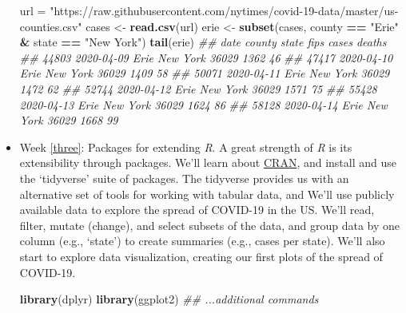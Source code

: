 \documentclass[
]{book}
\newenvironment{Shaded}{\begin{snugshade}}{\end{snugshade}}
\newcommand{\CommentTok}[1]{\textcolor[rgb]{0.56,0.35,0.01}{\textit{#1}}}
\newcommand{\KeywordTok}[1]{\textcolor[rgb]{0.13,0.29,0.53}{\textbf{#1}}}
\newcommand{\NormalTok}[1]{#1}
\newcommand{\OperatorTok}[1]{\textcolor[rgb]{0.81,0.36,0.00}{\textbf{#1}}}
\newcommand{\StringTok}[1]{\textcolor[rgb]{0.31,0.60,0.02}{#1}}
\begin{document}
\begin{itemize}
\begin{Shaded}
\begin{Highlighting}[]
\NormalTok{url =}\StringTok{ "https://raw.githubusercontent.com/nytimes/covid-19-data/master/us-counties.csv"}
\NormalTok{cases <-}\StringTok{ }\KeywordTok{read.csv}\NormalTok{(url)}
\NormalTok{erie <-}\StringTok{ }\KeywordTok{subset}\NormalTok{(cases, county }\OperatorTok{==}\StringTok{ "Erie"} \OperatorTok{&}\StringTok{ }\NormalTok{state }\OperatorTok{==}\StringTok{ "New York"}\NormalTok{)}
\KeywordTok{tail}\NormalTok{(erie)}
\CommentTok{##             date county    state  fips cases deaths}
\CommentTok{## 44803 2020-04-09   Erie New York 36029  1362     46}
\CommentTok{## 47417 2020-04-10   Erie New York 36029  1409     58}
\CommentTok{## 50071 2020-04-11   Erie New York 36029  1472     62}
\CommentTok{## 52744 2020-04-12   Erie New York 36029  1571     75}
\CommentTok{## 55428 2020-04-13   Erie New York 36029  1624     86}
\CommentTok{## 58128 2020-04-14   Erie New York 36029  1668     99}
\end{Highlighting}
\end{Shaded}
\item
  Week \ref{three}: Packages for extending \emph{R}. A great strength of \emph{R} is its extensibility through packages. We'll learn about \href{https://cran.r-project.org}{CRAN}, and install and use the `tidyverse' suite of packages. The tidyverse provides us with an alternative set of tools for working with tabular data, and We'll use publicly available data to explore the spread of COVID-19 in the US. We'll read, filter, mutate (change), and select subsets of the data, and group data by one column (e.g., `state') to create summaries (e.g., cases per state). We'll also start to explore data visualization, creating our first plots of the spread of COVID-19.

\begin{Shaded}
\begin{Highlighting}[]
\KeywordTok{library}\NormalTok{(dplyr)}
\KeywordTok{library}\NormalTok{(ggplot2)}
\CommentTok{## ...additional commands}
\end{Highlighting}
\end{Shaded}


\end{itemize}
\end{document}

